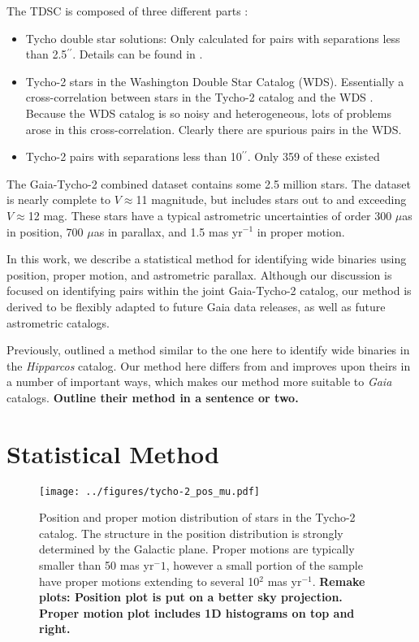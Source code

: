 \documentclass[usenatbib]{mnras}
\newcommand{\asec}{\ifmmode {^{\prime\prime}}\else$^{\prime\prime}$\fi}
\begin{document}
The TDSC is composed of three different parts \citep{fabricius02}:
\begin{itemize}
\item Tycho double star solutions: Only calculated for pairs with separations less than 2.5\asec. Details can be found in \citet{hog00a}.\\
\item Tycho-2 stars in the Washington Double Star Catalog (WDS). Essentially a cross-correlation between stars in the Tycho-2 catalog and the WDS \citep{mason00}. Because the WDS catalog is so noisy and heterogeneous, lots of problems arose in this cross-correlation. Clearly there are spurious pairs in the WDS. \\
\item Tycho-2 pairs with separations less than 10\asec. Only 359 of these existed
\end{itemize}


The Gaia-Tycho-2 combined dataset contains some 2.5 million stars. The dataset is nearly complete to $V\approx$11 magnitude, but includes stars out to and exceeding $V\approx$12 mag. These stars have a typical astrometric uncertainties of order 300 $\mu$as in position, 700 $\mu$as in parallax, and 1.5 mas yr$^{-1}$ in proper motion. 





In this work, we describe a statistical method for identifying wide binaries using position, proper motion, and astrometric parallax. Although our discussion is focused on identifying pairs within the joint Gaia-Tycho-2 catalog, our method is derived to be flexibly adapted to future Gaia data releases, as well as future astrometric catalogs.

Previously, \citet{shaya11} outlined a method similar to the one here to identify wide binaries in the {\it Hipparcos} catalog. Our method here differs from and improves upon theirs in a number of important ways, which makes our method more suitable to {\it Gaia} catalogs. {\bf Outline their method in a sentence or two.}


\section{Statistical Method}


\begin{figure}
\begin{center}
\texttt{[image: ../figures/tycho-2\_pos\_mu.pdf]}
\caption{ Position and proper motion distribution of stars in the Tycho-2 catalog. The structure in the position distribution is strongly determined by the Galactic plane. Proper motions are typically smaller than 50 mas yr$^-1$, however a small portion of the sample have proper motions extending to several 10$^2$ mas yr$^{-1}$. {\bf Remake plots: Position plot is put on a better sky projection. Proper motion plot includes 1D histograms on top and right.}}
\label{fig:tycho-2_pos_mu}
\end{center}
\end{figure}
\end{document}
